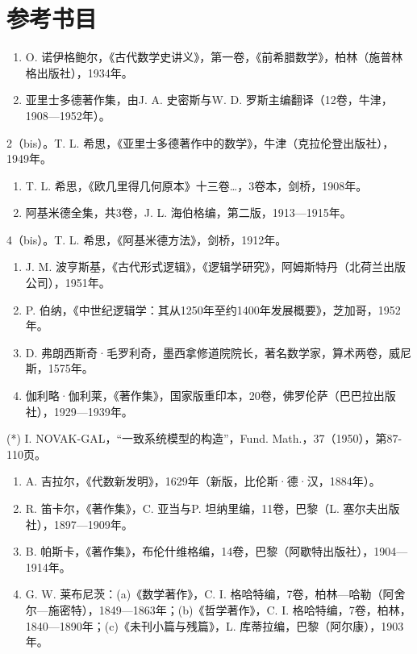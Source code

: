 \section*{参考书目}
{}

\begin{enumerate}
\def\labelenumi{\arabic{enumi}.}
\item
  O. 诺伊格鲍尔，《古代数学史讲义》，第一卷，《前希腊数学》，柏林（施普林格出版社），1934年。
\item
  亚里士多德著作集，由J. A. 史密斯与W. D. 罗斯主编翻译（12卷，牛津，1908—1952年）。
\end{enumerate}

2（bis）。T. L. 希思，《亚里士多德著作中的数学》，牛津（克拉伦登出版社），1949年。

\begin{enumerate}
\def\labelenumi{\arabic{enumi}.}
\setcounter{enumi}{2}
\item
  T. L. 希思，《欧几里得几何原本》十三卷\ldots，3卷本，剑桥，1908年。
\item
  阿基米德全集，共3卷，J. L. 海伯格编，第二版，1913—1915年。
\end{enumerate}

4（bis）。T. L. 希思，《阿基米德方法》，剑桥，1912年。

\begin{enumerate}
\def\labelenumi{\arabic{enumi}.}
\setcounter{enumi}{4}
\item
  J. M. 波亨斯基，《古代形式逻辑》，《逻辑学研究》，阿姆斯特丹（北荷兰出版公司），1951年。
\item
  P. 伯纳，《中世纪逻辑学：其从1250年至约1400年发展概要》，芝加哥，1952年。
\item
  D. 弗朗西斯奇·毛罗利奇，墨西拿修道院院长，著名数学家，算术两卷，威尼斯，1575年。
\item
  伽利略·伽利莱，《著作集》，国家版重印本，20卷，佛罗伦萨（巴巴拉出版社），1929—1939年。
\end{enumerate}

(*) I. NOVAK-GAL，“一致系统模型的构造”，Fund. Math.，37（1950），第87-110页。

\begin{enumerate}
\def\labelenumi{\arabic{enumi}.}
\setcounter{enumi}{8}
\item
  A. 吉拉尔，《代数新发明》，1629年（新版，比伦斯·德·汉，1884年）。
\item
  R. 笛卡尔，《著作集》，C. 亚当与P. 坦纳里编，11卷，巴黎（L. 塞尔夫出版社），1897—1909年。
\item
  B. 帕斯卡，《著作集》，布伦什维格编，14卷，巴黎（阿歇特出版社），1904—1914年。
\item
  G. W. 莱布尼茨：(a)《数学著作》，C. I. 格哈特编，7卷，柏林—哈勒（阿舍尔—施密特），1849—1863年；(b)《哲学著作》，C. I. 格哈特编，7卷，柏林，1840—1890年；(c)《未刊小篇与残篇》，L. 库蒂拉编，巴黎（阿尔康），1903年。
\end{enumerate}

